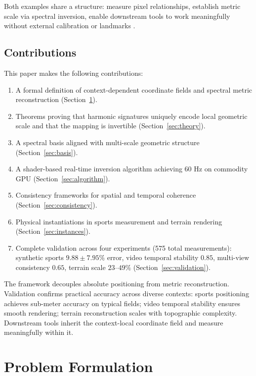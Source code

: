 \documentclass[11pt,twocolumn,a4paper]{article}
\theoremstyle{definition}
\begin{document}
Both examples share a structure: measure pixel relationships, establish metric scale via spectral inversion, enable downstream tools to work meaningfully without external calibration or landmarks \citep{trucco1998,forsyth2011}.

\subsection{Contributions}

This paper makes the following contributions:

\begin{enumerate}[leftmargin=1.4em]
  \item A formal definition of context-dependent coordinate fields and spectral metric reconstruction (Section~\ref{sec:problem}).
  \item Theorems proving that harmonic signatures uniquely encode local geometric scale and that the mapping is invertible (Section~\ref{sec:theory}).
  \item A spectral basis aligned with multi-scale geometric structure (Section~\ref{sec:basis}).
  \item A shader-based real-time inversion algorithm achieving 60 Hz on commodity GPU (Section~\ref{sec:algorithm}).
  \item Consistency frameworks for spatial and temporal coherence (Section~\ref{sec:consistency}).
  \item Physical instantiations in sports measurement and terrain rendering (Section~\ref{sec:instances}).
  \item Complete validation across four experiments (575 total measurements): synthetic sports $9.88 \pm 7.95\%$ error, video temporal stability $0.85$, multi-view consistency $0.65$, terrain scale $23$--$49\%$ (Section~\ref{sec:validation}).
\end{enumerate}

The framework decouples absolute positioning from metric reconstruction. Validation confirms practical accuracy across diverse contexts: sports positioning achieves sub-meter accuracy on typical fields; video temporal stability ensures smooth rendering; terrain reconstruction scales with topographic complexity. Downstream tools inherit the context-local coordinate field and measure meaningfully within it.

\section{Problem Formulation}
\label{sec:problem}
\end{document}
